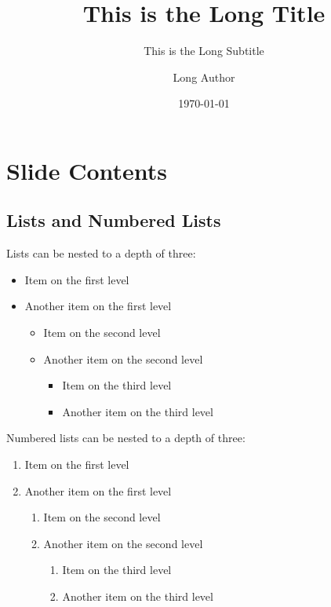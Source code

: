 \documentclass[
	aspectratio=169, %
	8pt, %
]{beamer}
\title[Short Title]{This is the Long Title} %
\subtitle[Short Subtitle]{This is the Long Subtitle} %
\author[Short Author]{Long Author} %
\date{\today} %
\begin{document}
\maketitle[iz][75] %

\section{Slide Contents}

\subsection{Lists and Numbered Lists}
\begin{frame}{\insertsubsection}
	\begin{fancycolumns}
		Lists can be nested to a depth of three:
		\begin{itemize}
			\item Item on the first level
			\item Another item on the first level
			\begin{itemize}
				\item Item on the second level
				\item Another item on the second level
			\begin{itemize}
			\item Item on the third level
			\item Another item on the third level
			\end{itemize}
		\end{itemize}
	\end{itemize}
	\nextcolumn
	Numbered lists can be nested to a depth of three:
	\begin{enumerate}
		\item Item on the first level
		\item Another item on the first level
		\begin{enumerate}
			\item Item on the second level
			\item Another item on the second level
				\begin{enumerate}
					\item Item on the third level
					\item Another item on the third level
				\end{enumerate}
			\end{enumerate}
		\end{enumerate}
	\end{fancycolumns}
\end{frame}
\end{document}
